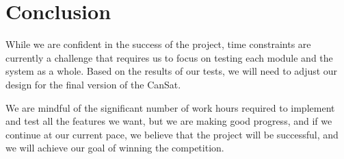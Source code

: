 \section{Conclusion}

While we are confident in the success of the project, time constraints are currently a challenge that requires us to focus on testing each module and the system as a whole. Based on the results of our tests, we will need to adjust our design for the final version of the CanSat. 

We are mindful of the significant number of work hours required to implement and test all the features we want, but we are making good progress, and if we continue at our current pace, we believe that the project will be successful, and we will achieve our goal of winning the competition.

% 
